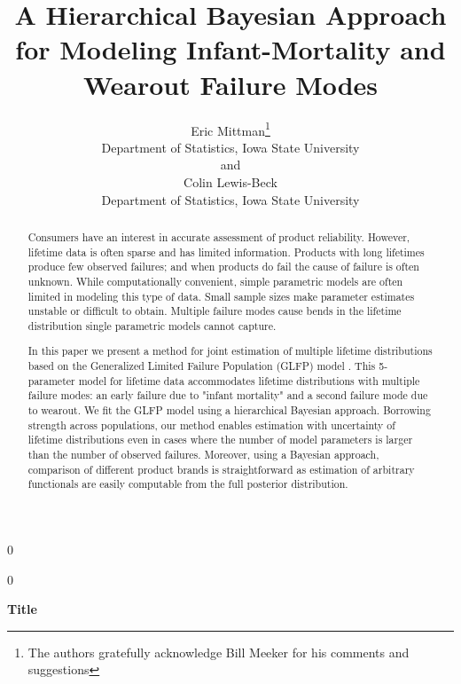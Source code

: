 \documentclass[12pt]{article}
\newcommand{\blind}{0}
\begin{document}
\def\spacingset#1{\renewcommand{\baselinestretch}%
{#1}\small\normalsize} \spacingset{1}



\blind
{
  \title{\bf A Hierarchical Bayesian Approach for Modeling Infant-Mortality and Wearout Failure Modes}
  \author{Eric Mittman\thanks{
    The authors gratefully acknowledge Bill Meeker for his comments and suggestions}\hspace{.2cm}\\
    Department of Statistics, Iowa State University\\
    and \\
    Colin Lewis-Beck \\
    Department of Statistics, Iowa State University}
  \maketitle
} \fi

\blind
{
  \bigskip
  \bigskip
  \bigskip
  \begin{center}
    {\LARGE\bf Title}
\end{center}
  \medskip
} \fi

\bigskip
\begin{abstract}
Consumers have an interest in accurate assessment of product reliability.  However, lifetime data is often sparse and has limited information.  Products with long lifetimes produce few observed failures; and when products do fail the cause of failure is often unknown.  While computationally convenient, simple parametric models are often limited in modeling this type of data.  Small sample sizes make parameter estimates unstable or difficult to obtain.  Multiple failure modes cause bends in the lifetime distribution single parametric models cannot capture.  

In this paper we present a method for joint estimation of multiple lifetime distributions based on the Generalized Limited Failure Population (GLFP) model \citep{chan}. This 5-parameter model for lifetime data accommodates lifetime distributions with multiple failure modes:  an early failure due to "infant mortality" and a second failure mode due to wearout. We fit the GLFP model using a hierarchical Bayesian approach.  Borrowing strength across populations, our method enables estimation with uncertainty of lifetime distributions even in cases where the number of model parameters is larger than the number of observed failures.  Moreover, using a Bayesian approach, comparison of different product brands is straightforward as estimation of arbitrary functionals are easily computable from the full posterior distribution.
\end{abstract}
\end{document}
